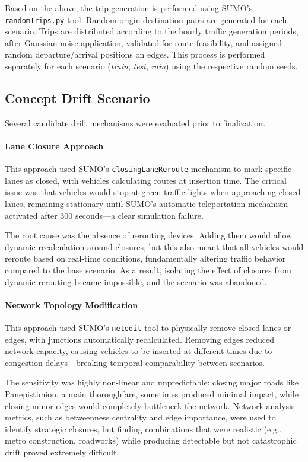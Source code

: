 Based on the above, the trip generation is performed using SUMO's \texttt{randomTrips.py} tool.
Random origin-destination pairs are generated for each scenario.
Trips are distributed according to the hourly traffic generation periods, after Gaussian noise application, validated for route feasibility, and assigned random departure/arrival positions on edges.
This process is performed separately for each scenario (\emph{train}, \emph{test}, \emph{rain}) using the respective random seeds.

\subsection{Concept Drift Scenario}

Several candidate drift mechanisms were evaluated prior to finalization.

\paragraph{Lane Closure Approach}
This approach used SUMO's \texttt{closingLaneReroute} mechanism to mark specific lanes as closed, with vehicles calculating routes at insertion time.
The critical issue was that vehicles would stop at green traffic lights when approaching closed lanes, remaining stationary until SUMO's automatic teleportation mechanism activated after 300 seconds—a clear simulation failure.

The root cause was the absence of rerouting devices.
Adding them would allow dynamic recalculation around closures, but this also meant that all vehicles would reroute based on real-time conditions, fundamentally altering traffic behavior compared to the base scenario.
As a result, isolating the effect of closures from dynamic rerouting became impossible, and the scenario was abandoned.

\paragraph{Network Topology Modification}
This approach used SUMO's \texttt{netedit} tool to physically remove closed lanes or edges, with junctions automatically recalculated. Removing edges reduced network capacity, causing vehicles to be inserted at different times due to congestion delays—breaking temporal comparability between scenarios.

The sensitivity was highly non-linear and unpredictable: closing major roads like Panepistimiou, a main thoroughfare, sometimes produced minimal impact, while closing minor edges would completely bottleneck the network.
Network analysis metrics, such as betweenness centrality and edge importance, were used to identify strategic closures, but finding combinations that were realistic (e.g., metro construction, roadworks) while producing detectable but not catastrophic drift proved extremely difficult.

